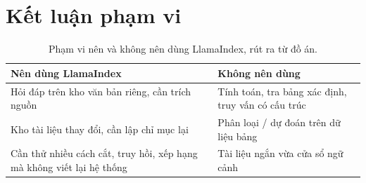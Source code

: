 \section{Kết luận phạm vi}

\begin{table}[H]
  \centering
  \small
  \begin{tabularx}{\textwidth}{X X}
    \toprule
    \textbf{Nên dùng LlamaIndex} & \textbf{Không nên dùng} \\
    \midrule
    Hỏi đáp trên kho văn bản riêng, cần trích nguồn & Tính toán, tra bảng xác định, truy vấn có cấu trúc \\
    Kho tài liệu thay đổi, cần lập chỉ mục lại & Phân loại / dự đoán trên dữ liệu bảng \\
    Cần thử nhiều cách cắt, truy hồi, xếp hạng mà không viết lại hệ thống & Tài liệu ngắn vừa cửa sổ ngữ cảnh \\
    \bottomrule
  \end{tabularx}
  \caption{Phạm vi nên và không nên dùng LlamaIndex, rút ra từ đồ án.}
\end{table}
